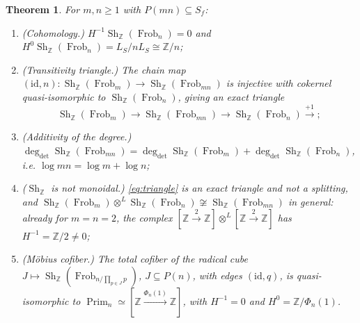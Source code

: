 \documentclass[11pt]{amsart}
\newtheorem{theorem}{Theorem}[section]
\theoremstyle{definition}
\theoremstyle{remark}
\newcommand{\Z}{\mathbb Z}
\newcommand{\Frob}{\operatorname{Frob}}
\newcommand{\Sh}{\operatorname{Sh}}
\newcommand{\Prim}{\operatorname{Prim}}
\newcommand{\degdet}{\operatorname{deg}_{\mathrm{det}}}
\begin{document}
\begin{theorem}\label{thm:shstructure}
For $m,n\ge1$ with $P(mn)\subseteq S_f$:
\begin{enumerate}
\item[(i)] \emph{(Cohomology.)} $H^{-1}\Sh_\Z(\Frob_n)=0$ and
$H^0\Sh_\Z(\Frob_n)=L_S/nL_S\cong\Z/n$;
\item[(ii)] \emph{(Transitivity triangle.)} The chain map
$(\mathrm{id},n):\Sh_\Z(\Frob_m)\to\Sh_\Z(\Frob_{mn})$ is injective with
cokernel quasi-isomorphic to $\Sh_\Z(\Frob_n)$, giving an exact triangle
\begin{equation}\label{eq:triangle}
  \Sh_\Z(\Frob_m)\to\Sh_\Z(\Frob_{mn})\to\Sh_\Z(\Frob_n)\xrightarrow{+1};
\end{equation}
\item[(iii)] \emph{(Additivity of the degree.)}
$\degdet\Sh_\Z(\Frob_{mn})=\degdet\Sh_\Z(\Frob_m)+\degdet\Sh_\Z(\Frob_n)$,
i.e. $\log mn=\log m+\log n$;
\item[(iv)] \emph{($\Sh_\Z$ is not monoidal.)} \eqref{eq:triangle} is an exact
triangle and not a splitting, and
$\Sh_\Z(\Frob_m)\otimes^L\Sh_\Z(\Frob_n)\not\cong\Sh_\Z(\Frob_{mn})$ in
general: already for $m=n=2$, the complex
$[\Z\xrightarrow{2}\Z]\otimes^L[\Z\xrightarrow{2}\Z]$ has $H^{-1}=\Z/2\ne0$;
\item[(v)] \emph{(M\"obius cofiber.)} The total cofiber of the radical cube
$J\mapsto\Sh_\Z(\Frob_{n/\prod_{p\in J}p})$, $J\subseteq P(n)$, with edges
$(\mathrm{id},q)$, is quasi-isomorphic to
$\Prim_n\simeq[\Z\xrightarrow{\Phi_n(1)}\Z]$, with $H^{-1}=0$ and
$H^0=\Z/\Phi_n(1)$.
\end{enumerate}
\end{theorem}
\end{document}
